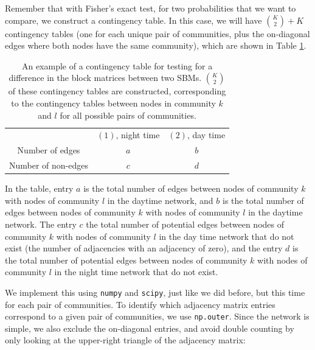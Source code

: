 Remember that with Fisher's exact test, for two probabilities that we want to compare, we construct a contingency table. In this case, we will have $\binom K 2 + K$ contingency tables (one for each unique pair of communities, plus the on-diagonal edges where both nodes have the same community), which are shown in Table \ref{tab:ch8:twosampl_sbm:cont}.

\begin{table}[h]
    \centering
    \begin{tabular}{c|c| c}
         & $(1)$, night time & $(2)$, day time  \\
         Number of edges & $a$ & $b$ \\
         Number of non-edges &$c$ & $d$
    \end{tabular}
    \caption[Two-sample SBM contingency table.]{An example of a contingency table for testing for a difference in the block matrices between two SBMs. $\binom K 2$ of these contingency tables are constructed, corresponding to the contingency tables between nodes in community $k$ and $l$ for all possible pairs of communities.}
    \label{tab:ch8:twosampl_sbm:cont}
\end{table}

In the table, entry $a$ is the total number of edges between nodes of community $k$ with nodes of community $l$ in the daytime network, and $b$ is the total number of edges between nodes of community $k$ with nodes of community $l$ in the daytime network. The entry $c$ the total number of potential edges between nodes of community $k$ with nodes of community $l$ in the day time network that do not exist (the number of adjacencies with an adjacency of zero), and the entry $d$ is the total number of potential edges between nodes of community $k$ with nodes of community $l$ in the night time network that do not exist. 

We implement this using \texttt{numpy} and \texttt{scipy}, just like we did before, but this time for each pair of communities. To identify which adjacency matrix entries correspond to a given pair of communities, we use \texttt{np.outer}. Since the network is simple, we also exclude the on-diagonal entries, and avoid double counting by only looking at the upper-right triangle of the adjacency matrix:

